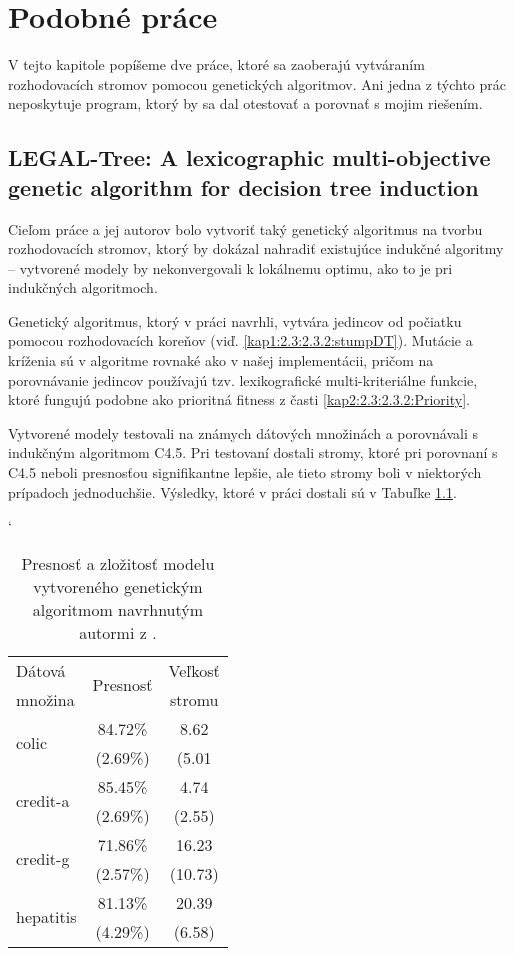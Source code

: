 \chapter{Podobné práce}\label{kap6:SimilarWorks}
V tejto kapitole popíšeme dve práce, ktoré sa zaoberajú vytváraním rozhodovacích stromov pomocou genetických algoritmov. Ani jedna z týchto prác neposkytuje program, ktorý by sa dal otestovať a porovnať s mojim riešením.

\section{LEGAL-Tree: A lexicographic multi-objective genetic algorithm for decision tree induction}\label{kap6: 6.1:Legal}
Cieľom práce a jej autorov \cite{kap6-legal} bolo vytvoriť taký genetický algoritmus na tvorbu rozhodovacích stromov, ktorý by dokázal nahradiť existujúce indukčné algoritmy -- vytvorené modely by nekonvergovali k lokálnemu optimu, ako to je pri indukčných algoritmoch. 

Genetický algoritmus, ktorý v práci navrhli, vytvára jedincov od počiatku pomocou rozhodovacích koreňov (viď. \ref{kap1:2.3:2.3.2:stumpDT}). Mutácie a kríženia sú v algoritme rovnaké ako v našej implementácii, pričom na porovnávanie jedincov používajú tzv. lexikografické multi-kriteriálne funkcie, ktoré fungujú podobne ako prioritná fitness z časti \ref{kap2:2.3:2.3.2:Priority}.

Vytvorené modely testovali na známych dátových množinách a porovnávali s indukčným algoritmom C4.5. Pri testovaní dostali stromy, ktoré pri porovnaní s C4.5 neboli presnosťou signifikantne lepšie, ale tieto stromy boli v niektorých prípadoch jednoduchšie. Výsledky, ktoré v práci dostali sú v Tabuľke \ref{fig:legaltable}.

\begin{table}[h!]
\catcode`
\centering 
\newcommand\T{\rule{0pt}{2.6ex}}       %
\newcommand\B{\rule[-1.2ex]{0pt}{0pt}} %
\begin{tabular}{|l||c|c||}
\hline
Dátová & \multirow{2}{*}{Presnosť} & Veľkosť \\ 
množina & & stromu \\
\hline
\multirow{2}{*}{colic} & 84.72\% & 8.62 \T\\[-1.5ex]
& \tiny (2.69\%) & \tiny (5.01\B\\
\hline
\multirow{2}{*}{credit-a} & 85.45\% & 4.74 \T\\[-1.5ex]
& \tiny (2.69\%) & \tiny (2.55)\B\\
\hline
\multirow{2}{*}{credit-g} & 71.86\% & 16.23 \T\\[-1.5ex]
& \tiny (2.57\%) & \tiny (10.73)\B\\
\hline
\multirow{2}{*}{hepatitis} & 81.13\% & 20.39 \T\\[-1.5ex]
& \tiny (4.29\%) & \tiny (6.58)\B\\
\hline
\end{tabular}
\caption{Presnosť a zložitosť modelu vytvoreného genetickým algoritmom navrhnutým autormi z \cite{kap6-legal}.}\label{fig:legaltable}
\end{table}

